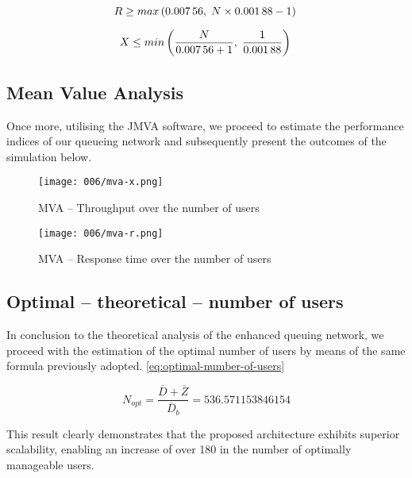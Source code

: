 \[
 R \geq max\left(\num[round-mode=places, round-precision=5]{0.00756138888888889},\;N\times\num[round-mode=places, round-precision=5]{0.00187777777777778}-1\right) \\
\]

\[
 X \leq min\left(\frac{N}{\num[round-mode=places, round-precision=5]{0.00756138888888889}+1},\;\frac{1}{\num[round-mode=places, round-precision=5]{0.00187777777777778}}\right) \\
\]

\subsection{Mean Value Analysis}

Once more, utilising the JMVA software, we proceed to estimate the performance indices of our queueing network and subsequently present the outcomes of the simulation below.

\begin{figure}[h]
	\centering
	\texttt{[image: 006/mva-x.png]}
	\caption{MVA -- Throughput over the number of users}
\end{figure}

\clearpage

\begin{figure}[h]
	\centering
	\texttt{[image: 006/mva-r.png]}
	\caption{MVA -- Response time over the number of users}
\end{figure}

\subsection{Optimal -- theoretical -- number of users}

In conclusion to the theoretical analysis of the enhanced queuing network, we proceed with the estimation of the optimal number of users by means of the same formula previously adopted. \ref{eq:optimal-number-of-users}

\begin{equation}
	N_{opt} = \frac{\overline{D} + \overline{Z}}{\overline{D}_b} = \num[round-mode=places, round-precision=5]{536.571153846154}
\end{equation}

This result clearly demonstrates that the proposed architecture exhibits superior scalability, enabling an increase of over 180 in the number of optimally manageable users.
